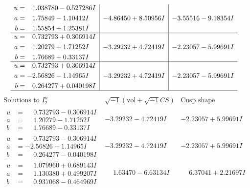 \documentclass[1p]{elsarticle_modified}
\theoremstyle{definition}
\newcommand{\I}{\sqrt{-1}}
\begin{document}
$$\begin{array}{c|c|c}
\begin{aligned}
u &= \phantom{-}1.038780 - 0.527286 I \\
a &= \phantom{-}1.75849 - 1.10412 I \\
b &= \phantom{-}1.55854 + 1.25381 I\end{aligned}
 & -4.86450 + 8.50956 I & -3.55516 - 9.18354 I \\ \hline\begin{aligned}
u &= \phantom{-}0.732793 + 0.306914 I \\
a &= \phantom{-}1.20279 + 1.71252 I \\
b &= \phantom{-}1.76689 + 0.33137 I\end{aligned}
 & -3.29232 + 4.72419 I & -2.23057 - 5.99691 I \\ \hline\begin{aligned}
u &= \phantom{-}0.732793 + 0.306914 I \\
a &= -2.56826 - 1.14965 I \\
b &= \phantom{-}0.264277 + 0.040198 I\end{aligned}
 & -3.29232 + 4.72419 I & -2.23057 - 5.99691 I\\
 \hline 
 \end{array}$$\newpage$$\begin{array}{c|c|c}  
\text{Solutions to }I^u_{2}& \I (\text{vol} + \sqrt{-1}CS) & \text{Cusp shape}\\
 \hline 
\begin{aligned}
u &= \phantom{-}0.732793 - 0.306914 I \\
a &= \phantom{-}1.20279 - 1.71252 I \\
b &= \phantom{-}1.76689 - 0.33137 I\end{aligned}
 & -3.29232 - 4.72419 I & -2.23057 + 5.99691 I \\ \hline\begin{aligned}
u &= \phantom{-}0.732793 - 0.306914 I \\
a &= -2.56826 + 1.14965 I \\
b &= \phantom{-}0.264277 - 0.040198 I\end{aligned}
 & -3.29232 - 4.72419 I & -2.23057 + 5.99691 I \\ \hline\begin{aligned}
u &= \phantom{-}1.079960 + 0.689143 I \\
a &= \phantom{-}1.130380 + 0.499207 I \\
b &= \phantom{-}0.937068 - 0.464969 I\end{aligned}
 & \phantom{-}1.63470 - 6.63134 I & \phantom{-}6.37041 + 2.21697 I \\ \hline\begin{aligned}

\end{aligned}
\end{array}$$
\end{document}
